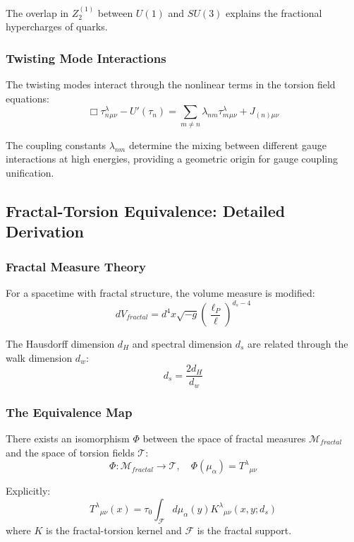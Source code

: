 The overlap in $Z_2^{(1)}$ between $U(1)$ and $SU(3)$ explains the fractional hypercharges of quarks.

\subsubsection{Twisting Mode Interactions}

The twisting modes interact through the nonlinear terms in the torsion field equations:
\begin{equation}
    \Box \tau_n^{\lambda}{}_{\mu\nu} - U'(\tau_n) = \sum_{m \neq n} \lambda_{nm} \tau_m^{\lambda}{}_{\mu\nu} + J_{(n)\mu\nu}
\end{equation}

The coupling constants $\lambda_{nm}$ determine the mixing between different gauge interactions at high energies, providing a geometric origin for gauge coupling unification.

\subsection{Fractal-Torsion Equivalence: Detailed Derivation}
\label{sec:fractal_torsion_detail}

\subsubsection{Fractal Measure Theory}

For a spacetime with fractal structure, the volume measure is modified:
\begin{equation}
    dV_{fractal} = d^4x \sqrt{-g} \left(\frac{\ell_P}{\ell}\right)^{d_s - 4}
\end{equation}

The Hausdorff dimension $d_H$ and spectral dimension $d_s$ are related through the walk dimension $d_w$:
\begin{equation}
    d_s = \frac{2d_H}{d_w}
\end{equation}

\subsubsection{The Equivalence Map}

\begin{theorem}
There exists an isomorphism $\Phi$ between the space of fractal measures $\mathcal{M}_{fractal}$ and the space of torsion fields $\mathcal{T}$:
\begin{equation}
    \Phi: \mathcal{M}_{fractal} \to \mathcal{T}, \quad \Phi(\mu_{\alpha}) = T^{\lambda}{}_{\mu\nu}
\end{equation}

Explicitly:
\begin{equation}
    T^{\lambda}{}_{\mu\nu}(x) = \tau_0 \int_{\mathcal{F}} d\mu_{\alpha}(y) K^{\lambda}{}_{\mu\nu}(x, y; d_s)
\end{equation}
where $K$ is the fractal-torsion kernel and $\mathcal{F}$ is the fractal support.
\end{theorem}

